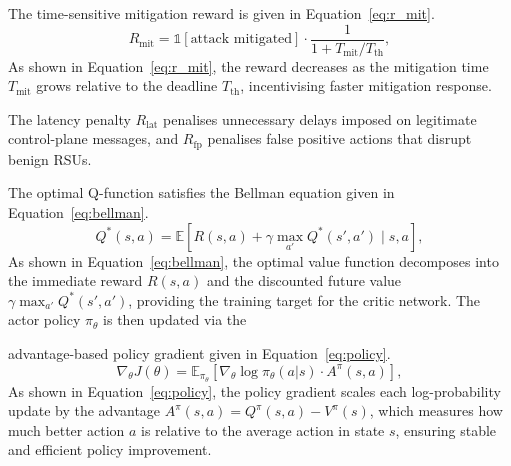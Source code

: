 The time-sensitive mitigation reward is given in
Equation~\eqref{eq:r_mit}.
\begin{equation}
R_{\mathrm{mit}} =
  \mathbb{1}[\text{attack mitigated}]
  \cdot \frac{1}{1 + T_{\mathrm{mit}}/T_{\mathrm{th}}},
\label{eq:r_mit}
\end{equation}
As shown in Equation~\eqref{eq:r_mit}, the reward decreases
as the mitigation time $T_{\mathrm{mit}}$ grows relative to
the deadline $T_{\mathrm{th}}$, incentivising faster
mitigation response.

The latency penalty $R_{\mathrm{lat}}$
penalises unnecessary delays imposed on legitimate control-plane
messages, and $R_{\mathrm{fp}}$ penalises false positive actions
that disrupt benign RSUs. 

The optimal Q-function satisfies the Bellman equation given
in Equation~\eqref{eq:bellman}.
\begin{equation}
Q^*(s,a) = \mathbb{E}\!\left[
  R(s,a) + \gamma\max_{a'}Q^*(s',a')\;\Big|\;s,a
\right],
\label{eq:bellman}
\end{equation}
As shown in Equation~\eqref{eq:bellman}, the optimal value
function decomposes into the immediate reward $R(s,a)$ and
the discounted future value $\gamma\max_{a'}Q^*(s',a')$,
providing the training target for the critic network.
The actor policy $\pi_\theta$ is then updated via the

advantage-based policy gradient given in
Equation~\eqref{eq:policy}.
\begin{equation}
\nabla_\theta J(\theta) =
  \mathbb{E}_{\pi_\theta}\!\left[
    \nabla_\theta\log\pi_\theta(a|s)
    \cdot A^\pi(s,a)
  \right],
\label{eq:policy}
\end{equation}
As shown in Equation~\eqref{eq:policy}, the policy gradient
scales each log-probability update by the advantage
$A^\pi(s,a) = Q^\pi(s,a) - V^\pi(s)$, which measures how
much better action $a$ is relative to the average action in
state $s$, ensuring stable and efficient policy improvement.

